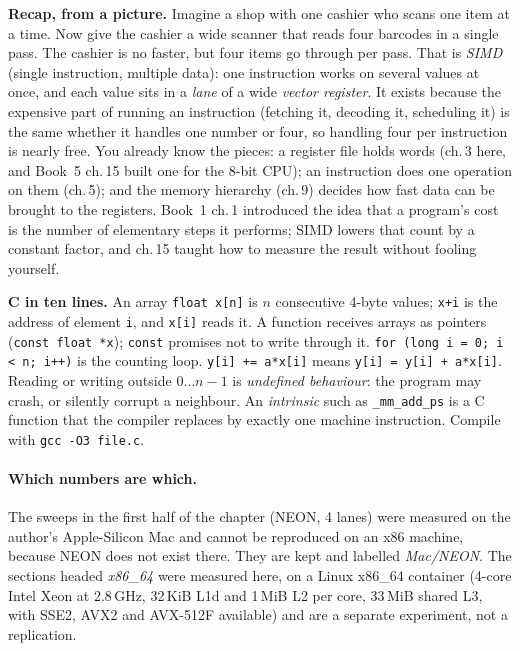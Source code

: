 \begin{rulebox}
\textbf{Recap, from a picture.} Imagine a shop with one cashier who
scans one item at a time. Now give the cashier a wide scanner that
reads four barcodes in a single pass. The cashier is no faster, but
four items go through per pass. That is \emph{SIMD} (single
instruction, multiple data): one instruction works on several values
at once, and each value sits in a \emph{lane} of a wide \emph{vector
register}. It exists because the expensive part of running an
instruction (fetching it, decoding it, scheduling it) is the same
whether it handles one number or four, so handling four per
instruction is nearly free. You already know the pieces: a register
file holds words (ch.\,3 here, and Book~5 ch.\,15 built one for the
8-bit CPU); an instruction does one operation on them (ch.\,5); and
the memory hierarchy (ch.\,9) decides how fast data can be brought to
the registers. Book~1 ch.\,1 introduced the idea that a program's
cost is the number of elementary steps it performs; SIMD lowers that
count by a constant factor, and ch.\,15 taught how to measure the
result without fooling yourself.

\textbf{C in ten lines.} An array \texttt{float x[n]} is $n$
consecutive 4-byte values; \texttt{x+i} is the address of element
\texttt{i}, and \texttt{x[i]} reads it. A function receives arrays as
pointers (\texttt{const float *x}); \texttt{const} promises not to
write through it. \texttt{for (long i = 0; i < n; i++)} is the
counting loop. \texttt{y[i] += a*x[i]} means
\texttt{y[i] = y[i] + a*x[i]}. Reading or writing outside
$0\dots n{-}1$ is \emph{undefined behaviour}: the program may crash,
or silently corrupt a neighbour. An \emph{intrinsic} such as
\texttt{\_mm\_add\_ps} is a C function that the compiler replaces by
exactly one machine instruction. Compile with \texttt{gcc -O3 file.c}.
\end{rulebox}

\paragraph{Which numbers are which.}
The sweeps in the first half of the chapter (NEON, 4 lanes) were
measured on the author's Apple-Silicon Mac and cannot be reproduced
on an x86 machine, because NEON does not exist there. They are kept
and labelled \emph{Mac/NEON}. The sections headed \emph{x86\_64}
were measured here, on a Linux x86\_64 container (4-core Intel Xeon
at 2.8\,GHz, 32\,KiB L1d and 1\,MiB L2 per core, 33\,MiB shared L3,
with SSE2, AVX2 and AVX-512F available) and are a separate
experiment, not a replication.


